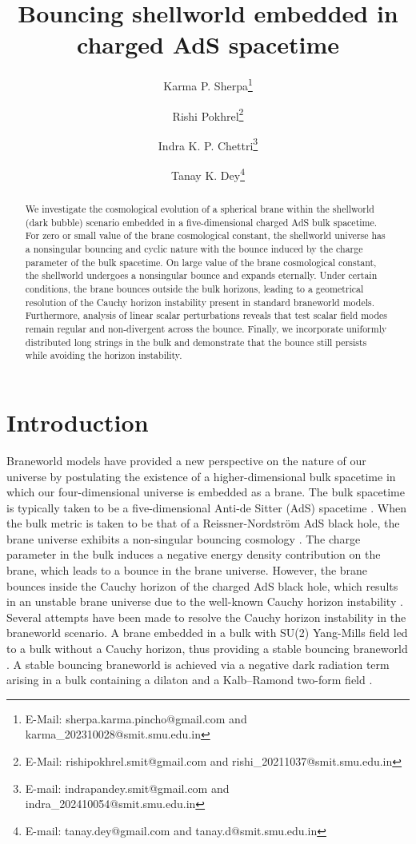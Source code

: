\documentclass[12pt]{article}
\title{Bouncing shellworld embedded in charged AdS spacetime}
\author{Karma P. Sherpa\thanks{E-Mail: sherpa.karma.pincho@gmail.com and karma\_202310028@smit.smu.edu.in} }
\author{Rishi Pokhrel\thanks{E-Mail: rishipokhrel.smit@gmail.com and rishi\_20211037@smit.smu.edu.in} }
\author{Indra K. P. Chettri\thanks{E-mail: indrapandey.smit@gmail.com and indra\_202410054@smit.smu.edu.in}}
\author{Tanay K. Dey\thanks{E-mail: tanay.dey@gmail.com and tanay.d@smit.smu.edu.in}}
\affil{Department of Physics, Sikkim Manipal Institute of Technology, Sikkim Manipal University, Majitar, Sikkim-737136, India.}
\date{}
\begin{document}
		\maketitle
		
\begin{abstract}
We investigate the cosmological evolution of a spherical brane within the shellworld (dark bubble) scenario embedded in a five-dimensional charged AdS bulk spacetime. For zero or small value of the brane cosmological constant, the shellworld universe has a nonsingular bouncing and cyclic nature with the bounce induced by the charge parameter of the bulk spacetime. On large value of the brane cosmological constant, the shellworld undergoes a nonsingular bounce and expands eternally. Under certain conditions, the brane bounces outside the bulk horizons, leading to a geometrical resolution of the Cauchy horizon instability present in standard braneworld models. Furthermore, analysis of linear scalar perturbations reveals that test scalar field modes remain regular and non-divergent across the bounce. Finally, we incorporate uniformly distributed long strings in the bulk and demonstrate that the bounce still persists while avoiding the horizon instability.


\end{abstract}		
	

\clearpage



\section{Introduction}
Braneworld models \cite{Randall:1999ee,Randall:1999vf} have provided a new perspective on the nature of our universe by postulating the existence of a higher-dimensional bulk spacetime in which our four-dimensional universe is embedded as a brane. The bulk spacetime is typically taken to be a five-dimensional Anti-de Sitter (AdS) spacetime \cite{Chamblin:1999ya,Kraus:1999it,Nojiri:2002hz}. When the bulk metric is taken to be that of a Reissner-Nordstr\"om AdS black hole, the brane universe exhibits a non-singular bouncing cosmology \cite{Mukherji:2002ft}. The charge parameter in the bulk induces a negative energy density contribution on the brane, which leads to a bounce in the brane universe. However, the brane bounces inside the Cauchy horizon of the charged AdS black hole, which results in an unstable brane universe due to the well-known Cauchy horizon instability \cite{Hovdebo:2003ug}. Several attempts have been made to resolve the Cauchy horizon instability in the braneworld scenario. A brane embedded in a bulk with SU(2) Yang-Mills field led to a bulk without a Cauchy horizon, thus providing a stable bouncing braneworld \cite{Okuyama:2004in}. A stable bouncing braneworld  is achieved via a negative dark radiation term arising in a bulk containing a dilaton and a Kalb–Ramond two-form field \cite{DeRisi:2007dn}. 
\end{document}
